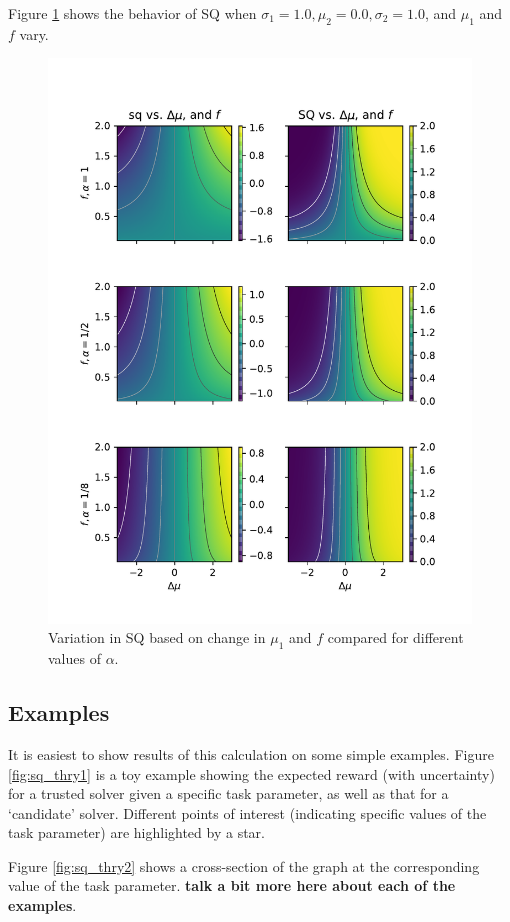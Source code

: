 Figure \ref{fig:sq_surf} shows the behavior of SQ when $\sigma_1=1.0,\mu_2=0.0,\sigma_2=1.0$, and $\mu_1$ and $f$ vary.

\begin{figure}[htbp]
    \centering
    \includegraphics[width=0.9\linewidth]{Figures/sq_surf}
    \caption{Variation in SQ based on change in $\mu_1$ and $f$ compared for different values of $\alpha$.}
    \label{fig:sq_surf}
\end{figure}

\subsection{Examples}
It is easiest to show results of this calculation on some simple examples. Figure \ref{fig:sq_thry1} is a toy example showing the expected reward (with uncertainty) for a trusted solver given a specific task parameter, as well as that for a `candidate' solver. Different points of interest (indicating specific values of the task parameter) are highlighted by a star.

Figure \ref{fig:sq_thry2} shows a cross-section of the graph at the corresponding value of the task parameter. \textbf{talk a bit more here about each of the examples}.

